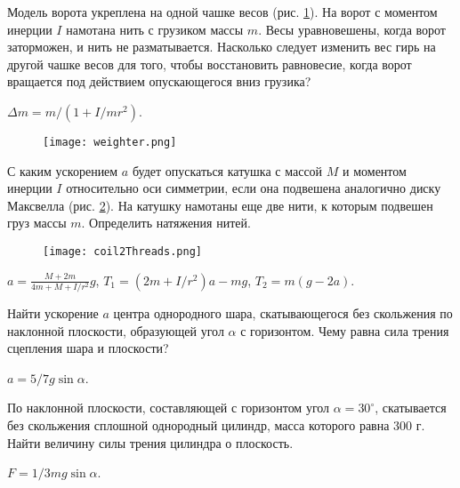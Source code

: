 \begin{ex} %
Модель ворота укреплена на одной чашке весов (рис. \ref{weighter}). На ворот с моментом инерции $I$ намотана нить с грузиком массы $m$. Весы уравновешены, когда ворот заторможен, и нить не разматывается. Насколько следует изменить вес гирь на другой чашке весов для того, чтобы восстановить равновесие, когда ворот вращается под действием опускающегося вниз грузика?
\begin{ans}
$\Delta m = m/(1+I/mr^2)$.
\end{ans}
\end{ex}	

\begin{figure}[h]
\centering
\texttt{[image: weighter.png]}
\caption{}
\label{weighter}
\end{figure}

\begin{ex} %
С каким ускорением $a$ будет опускаться катушка с массой $M$ и моментом инерции $I$ относительно оси симметрии, если она подвешена аналогично диску Максвелла (рис. \ref{coil2Threads}). На катушку намотаны еще две нити, к которым подвешен груз массы $m$. Определить натяжения нитей.

\begin{figure}
\centering
\texttt{[image: coil2Threads.png]}
\caption{}
\label{coil2Threads}
\end{figure}

\begin{ans}
$a = \frac{M+2m}{4m+M+I/r^2}g$, $T_1 = (2m+I/r^2)a - mg$, $T_2=m(g-2a)$.
\end{ans}
\end{ex}	

\begin{ex} %
Найти ускорение $a$ центра однородного шара, скатывающегося без скольжения по наклонной плоскости, образующей угол $\alpha$ с горизонтом. Чему равна сила трения сцепления шара и плоскости?
\begin{ans}
$a=5/7g\sin \alpha$.
\end{ans}
\end{ex}	

\begin{ex} %
По наклонной плоскости, составляющей с горизонтом угол $\alpha = 30^{\circ}$, скатывается без скольжения сплошной однородный цилиндр, масса которого равна 300 г. Найти величину силы трения цилиндра о плоскость.
\begin{ans}
$F = 1/3 mg \sin \alpha$.
\end{ans}
\end{ex}	

